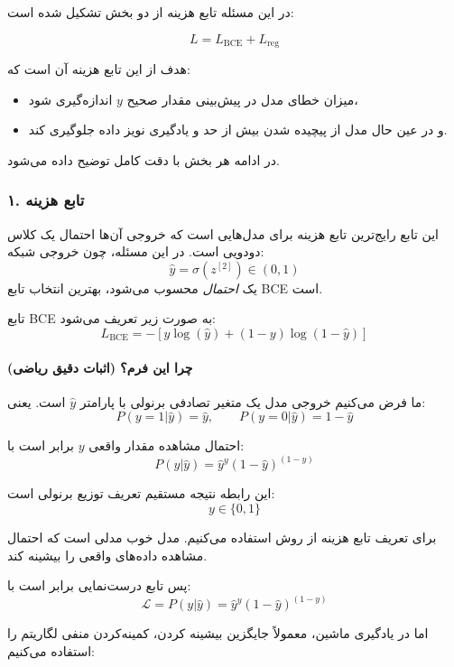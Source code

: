 \documentclass{article}
\begin{document}
در این مسئله تابع هزینه از دو بخش تشکیل شده است:

\[
L = L_{\text{BCE}} + L_{\text{reg}}
\]

هدف از این تابع هزینه آن است که:
\begin{itemize}
	\item میزان خطای مدل در پیش‌بینی مقدار صحیح \(y\) اندازه‌گیری شود،
	\item و در عین حال مدل از پیچیده شدن بیش از حد و یادگیری نویز داده جلوگیری کند.
\end{itemize}

در ادامه هر بخش با دقت کامل توضیح داده می‌شود.

\subsubsection*{۱. تابع هزینه }

این تابع رایج‌ترین تابع هزینه برای مدل‌هایی است که خروجی آن‌ها احتمال یک کلاس دودویی است.  
در این مسئله، چون خروجی شبکه:
\[
\hat{y} = \sigma(z^{[2]}) \in (0,1)
\]
یک \emph{احتمال} محسوب می‌شود، بهترین انتخاب تابع BCE است.

تابع BCE به صورت زیر تعریف می‌شود:
\[
L_{\text{BCE}} = -\left[ y \log(\hat{y}) + (1-y) \log(1-\hat{y}) \right]
\]

\paragraph{چرا این فرم؟ (اثبات دقیق ریاضی)}

ما فرض می‌کنیم خروجی مدل یک متغیر تصادفی برنولی با پارامتر \(\hat{y}\) است.  
یعنی:
\[
P(y = 1|\hat{y}) = \hat{y}, 
\qquad
P(y = 0|\hat{y}) = 1 - \hat{y}
\]

احتمال مشاهده مقدار واقعی \(y\) برابر است با:
\[
P(y|\hat{y}) = \hat{y}^{y}(1-\hat{y})^{(1-y)}
\]

این رابطه نتیجه مستقیم تعریف توزیع برنولی است:
\[
y \in \{0,1\}
\]

برای تعریف تابع هزینه از روش   استفاده می‌کنیم.  
مدل خوب مدلی است که احتمال مشاهده داده‌های واقعی را بیشینه کند.

پس تابع درست‌نمایی  برابر است با:
\[
\mathcal{L} = P(y|\hat{y}) = \hat{y}^{y}(1-\hat{y})^{(1-y)}
\]

اما در یادگیری ماشین، معمولاً جایگزین بیشینه کردن، کمینه‌کردن منفی لگاریتم  را استفاده می‌کنیم:
\end{document}
